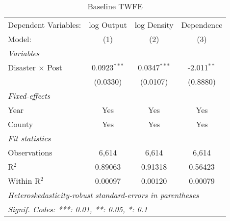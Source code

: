 
\begin{table}[htbp]
   \caption{Baseline TWFE}
   \centering
   \begin{adjustbox}{max width = \textwidth, center}
      \begin{tabular}{lccc}
         \tabularnewline \midrule \midrule
         Dependent Variables:    & log Output     & log Density    & Dependence\\  
         Model:                  & (1)            & (2)            & (3)\\  
         \midrule
         \emph{Variables}\\
         Disaster $\times$ Post  & 0.0923$^{***}$ & 0.0347$^{***}$ & -2.011$^{**}$\\   
                                 & (0.0330)       & (0.0107)       & (0.8880)\\   
         \midrule
         \emph{Fixed-effects}\\
         Year                    & Yes            & Yes            & Yes\\  
         County                  & Yes            & Yes            & Yes\\  
         \midrule
         \emph{Fit statistics}\\
         Observations            & 6,614          & 6,614          & 6,614\\  
         R$^2$                   & 0.89063        & 0.91318        & 0.56423\\  
         Within R$^2$            & 0.00097        & 0.00120        & 0.00079\\  
         \midrule \midrule
         \multicolumn{4}{l}{\emph{Heteroskedasticity-robust standard-errors in parentheses}}\\
         \multicolumn{4}{l}{\emph{Signif. Codes: ***: 0.01, **: 0.05, *: 0.1}}\\
      \end{tabular}
   \end{adjustbox}
\end{table}


